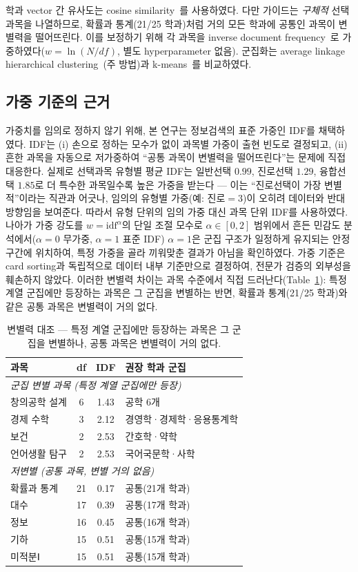 \documentclass[conference]{IEEEtran}
\begin{document}
학과 vector 간 유사도는 cosine similarity~\cite{manning2008}를 사용하였다.
다만 가이드는 \emph{구체적} 선택과목을 나열하므로, 확률과 통계(21/25 학과)처럼 거의 모든 학과에 공통인 과목이 변별력을 떨어뜨린다.
이를 보정하기 위해 각 과목을 inverse document frequency~\cite{sparck1972}로 가중하였다($w=\ln(N/df)$, 별도 hyperparameter 없음).
군집화는 average linkage hierarchical clustering~\cite{everitt2011}(주 방법)과 k-means~\cite{lloyd1982}를 비교하였다.

\subsection{가중 기준의 근거}

가중치를 임의로 정하지 않기 위해, 본 연구는 정보검색의 표준 가중인 IDF를 채택하였다.
IDF는 (i) 손으로 정하는 모수가 없이 과목별 가중이 출현 빈도로 결정되고, (ii) 흔한 과목을 자동으로 저가중하여 ``공통 과목이 변별력을 떨어뜨린다''는 문제에 직접 대응한다.
실제로 선택과목 유형별 평균 IDF는 일반선택 $0.99$, 진로선택 $1.29$, 융합선택 $1.85$로 더 특수한 과목일수록 높은 가중을 받는다 --- 이는 ``진로선택이 가장 변별적''이라는 직관과 어긋나, 임의의 유형별 가중(예: 진로$=3$)이 오히려 데이터와 반대 방향임을 보여준다.
따라서 유형 단위의 임의 가중 대신 과목 단위 IDF를 사용하였다.
나아가 가중 강도를 $w=\mathrm{idf}^{\alpha}$의 단일 조절 모수로 $\alpha\!\in\![0,2]$ 범위에서 흔든 민감도 분석에서($\alpha=0$ 무가중, $\alpha=1$ 표준 IDF) $\alpha=1$은 군집 구조가 일정하게 유지되는 안정 구간에 위치하여, 특정 가중을 골라 끼워맞춘 결과가 아님을 확인하였다.
가중 기준은 card sorting과 독립적으로 데이터 내부 기준만으로 결정하여, 전문가 검증의 외부성을 훼손하지 않았다.
이러한 변별력 차이는 과목 수준에서 직접 드러난다(Table~\ref{tab:discriminative}): 특정 계열 군집에만 등장하는 과목은 그 군집을 변별하는 반면, 확률과 통계(21/25 학과)와 같은 공통 과목은 변별력이 거의 없다.

\begin{table}[!ht]
\centering
\caption{변별력 대조 --- 특정 계열 군집에만 등장하는 과목은 그 군집을 변별하나, 공통 과목은 변별력이 거의 없다.}
\label{tab:discriminative}
\begin{tabular}{lccl}
\hline
과목 & df & IDF & 권장 학과 군집 \\
\hline
\multicolumn{4}{l}{\textit{군집 변별 과목 (특정 계열 군집에만 등장)}} \\
창의공학 설계 & 6 & 1.43 & 공학 6개 \\
경제 수학 & 3 & 2.12 & 경영학·경제학·응용통계학 \\
보건 & 2 & 2.53 & 간호학·약학 \\
언어생활 탐구 & 2 & 2.53 & 국어국문학·사학 \\
\hline
\multicolumn{4}{l}{\textit{저변별 (공통 과목, 변별 거의 없음)}} \\
확률과 통계 & 21 & 0.17 & 공통(21개 학과) \\
대수 & 17 & 0.39 & 공통(17개 학과) \\
정보 & 16 & 0.45 & 공통(16개 학과) \\
기하 & 15 & 0.51 & 공통(15개 학과) \\
미적분Ⅰ & 15 & 0.51 & 공통(15개 학과) \\
\hline
\end{tabular}
\end{table}
\end{document}
